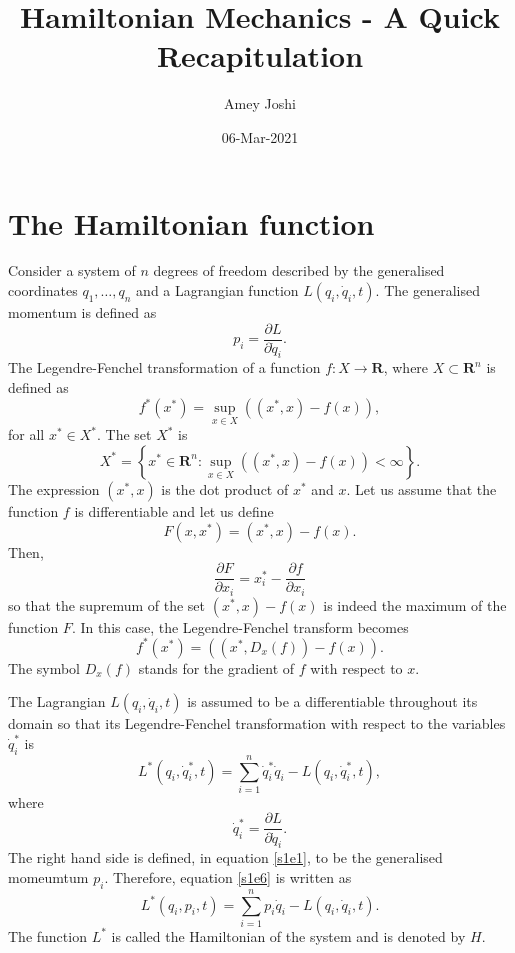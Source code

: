 \documentclass{article}
\title{Hamiltonian Mechanics - A Quick Recapitulation}
\author{Amey Joshi}
\date{06-Mar-2021}
\numberwithin{equation}{section}
\theoremstyle{plain}
\numberwithin{thm}{section}
\theoremstyle{plain}
\numberwithin{prop}{section}
\theoremstyle{definition}
\numberwithin{defn}{section}
\theoremstyle{remark}
\begin{document}
\maketitle
{}

\section{The Hamiltonian function}\label{s1}
Consider a system of $n$ degrees of freedom described by the generalised 
coordinates $q_1, \ldots, q_n$ and a Lagrangian function $L(q_i, \dot{q}_i, t)$.
The generalised momentum is defined as
\begin{equation}\label{s1e1}
p_i = \frac{\partial{L}}{\partial\dot{q}_i}.
\end{equation}
The Legendre-Fenchel transformation of a function $f:X \rightarrow 
\mathbf{R}$, where $X \subset \mathbf{R}^n$ is defined as
\begin{equation}\label{s1e2}
f^\ast(x^\ast) = \sup_{x \in X}\left((x^\ast, x) - f(x)\right), 
\end{equation}
for all $x^\ast \in X^\ast$. The set $X^\ast$ is 
\begin{equation}\label{s1e3}
X^\ast = \left\{x^\ast \in \mathbf{R}^n : \sup_{x \in X}
         \left((x^\ast, x) - f(x)\right) < \infty\right\}.
\end{equation}
The expression $(x^\ast, x)$ is the dot product of $x^\ast$ and $x$. Let us 
assume that the function $f$ is differentiable and let us define
\begin{equation}\label{s1e4}
F(x, x^\ast) = (x^\ast, x) - f(x).
\end{equation}
Then,
\[
\frac{\partial F}{\partial x_i} = x^\ast_i - \frac{\partial f}{\partial x_i}
\]
so that the supremum of the set $(x^\ast, x) - f(x)$ is indeed the maximum
of the function $F$. In this case, the Legendre-Fenchel transform becomes
\begin{equation}\label{s1e5}
f^\ast(x^\ast) = \left((x^\ast, D_x(f)) - f(x)\right).
\end{equation}
The symbol $D_x(f)$ stands for the gradient of $f$ with respect to $x$.

The Lagrangian $L(q_i, \dot{q}_i, t)$ is assumed to be a differentiable 
throughout its domain so that its Legendre-Fenchel transformation with respect 
to the variables $\dot{q}_i^\ast$ is
\begin{equation}\label{s1e6}
L^\ast(q_i, \dot{q}_i^\ast, t) = \sum_{i=1}^n \dot{q}_i^\ast \dot{q}_i - 
L(q_i, \dot{q}_i^\ast, t),
\end{equation}
where
\begin{equation}\label{s1e7}
\dot{q}_i^\ast = \frac{\partial L}{\partial\dot{q}_i}.
\end{equation}
The right hand side is defined, in equation \eqref{s1e1}, to be the generalised 
momeumtum $p_i$. Therefore, equation \eqref{s1e6} is written as
\begin{equation}\label{s1e8}
L^\ast(q_i, p_i, t) = \sum_{i=1}^n p_i\dot{q}_i - L(q_i, \dot{q}_i, t).
\end{equation}
The function $L^\ast$ is called the Hamiltonian of the system and is denoted
by $H$.
\end{document}

